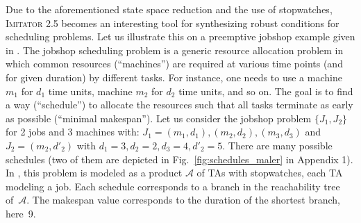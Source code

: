\documentclass{llncs}
\newcommand{\A}{\mathcal{A}}
\newcommand{\imitator}{\textsc{Imitator}}
\begin{document}
Due to the aforementioned state space reduction and the use of stopwatches, \imitator{} 2.5 becomes an interesting tool for synthesizing robust conditions for scheduling problems.
Let us illustrate this on a preemptive jobshop example given in \cite{AM02}.
The jobshop scheduling problem is a generic resource allocation problem in which common resources (``machines'') are required at various time points (and for given duration) by different tasks.
For instance, one needs to use a machine $m_1$ for $d_1$ time units, machine $m_2$ for $d_2$ time units, and so on.
The goal is to find a way (``schedule'') to allocate the resources such that all tasks terminate as early as possible (``minimal makespan'').
%
Let us consider the jobshop problem $\{J_1, J_2\}$ for 2 jobs and 3 machines  with: $J_1 = (m_1,d_1), (m_2,d_2),(m_3,d_3)$ and $J_2 = (m_2,d'_2)$ with $d_1 = 3, d_2=2, d_3=4, d'_2 = 5$.
There are many possible schedules (two of them are depicted in Fig.~\ref{fig:schedules_maler} in Appendix 1). 
%
In  \cite{AM02}, this problem is modeled as a product $\A$ of TAs with stopwatches, each TA modeling a job.
Each schedule corresponds to a branch in the reachability tree of~$\A$.
The makespan value corresponds to the
duration of the shortest branch, here~9.
% 
\end{document}
